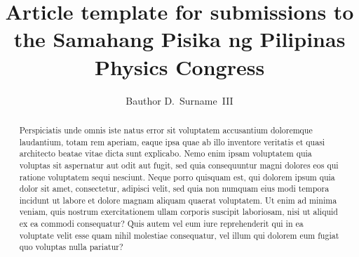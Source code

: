 \documentclass[10pt,a4paper,twoside]{article}
\begin{document}
\title{\TitleFont Article template for submissions to the Samahang Pisika ng Pilipinas Physics Congress}


\author[ ]{Bauthor D.~Surname~III
\lastauthorsep}





\begin{abstract}
\noindent
Perspiciatis unde omnis iste natus error sit voluptatem accusantium doloremque laudantium, totam rem aperiam, eaque ipsa quae ab illo inventore veritatis et quasi architecto beatae vitae dicta sunt explicabo. Nemo enim ipsam voluptatem quia voluptas sit aspernatur aut odit aut fugit, sed quia consequuntur magni dolores eos qui ratione voluptatem sequi nesciunt. Neque porro quisquam est, qui dolorem ipsum quia dolor sit amet, consectetur, adipisci velit, sed quia non numquam eius modi tempora incidunt ut labore et dolore magnam aliquam quaerat voluptatem. Ut enim ad minima veniam, quis nostrum exercitationem ullam corporis suscipit laboriosam, nisi ut aliquid ex ea commodi consequatur? Quis autem vel eum iure reprehenderit qui in ea voluptate velit esse quam nihil molestiae consequatur, vel illum qui dolorem eum fugiat quo voluptas nulla pariatur?


\end{abstract}
\end{document}
